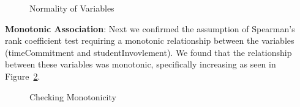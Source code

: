 \documentclass[
  letterpaper,
  DIV=11,
  numbers=noendperiod]{scrartcl}
\begin{document}
\begin{figure}


\caption{\label{fig-normality-of-variables}Normality of Variables}

\end{figure}%

\textbf{Monotonic Association}: Next we confirmed the assumption of
Spearman's rank coefficient test requiring a monotonic relationship
between the variables (timeCommitment and studentInvovlement). We found
that the relationship between these variables was monotonic,
specifically increasing as seen in
Figure~\ref{fig-scatter-plot-involvement}.

\begin{figure}


\caption{\label{fig-scatter-plot-involvement}Checking Monotonicity}

\end{figure}%
\end{document}
